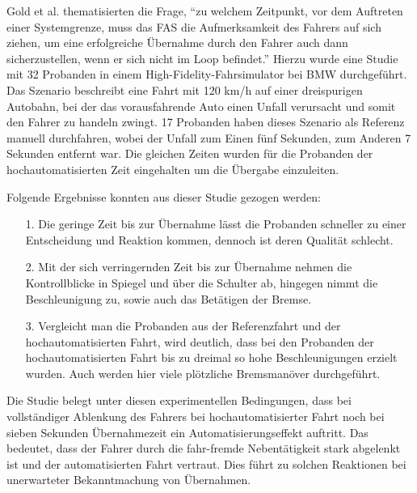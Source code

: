 Gold et al. thematisierten die Frage, ``zu welchem Zeitpunkt, vor dem Auftreten einer Systemgrenze, muss das FAS die Aufmerksamkeit des Fahrers auf sich ziehen, um eine erfolgreiche Übernahme durch den Fahrer auch dann sicherzustellen, wenn er sich nicht im Loop befindet.'' \cite{gold} %
Hierzu wurde eine Studie mit 32 Probanden in einem High-Fidelity-Fahrsimulator bei BMW durchgeführt. Das Szenario beschreibt eine Fahrt mit 120 km/h auf einer dreispurigen Autobahn, bei der das vorausfahrende Auto einen Unfall verursacht und somit den Fahrer zu handeln zwingt. 17 Probanden haben dieses Szenario als Referenz manuell durchfahren, wobei der Unfall zum Einen fünf Sekunden, zum Anderen 7 Sekunden entfernt war. Die gleichen Zeiten wurden für die Probanden der hochautomatisierten Zeit eingehalten um die Übergabe einzuleiten.  

Folgende Ergebnisse konnten aus dieser Studie gezogen werden:
\begin{itemize}
	\item[1.] Die geringe Zeit bis zur Übernahme lässt die Probanden schneller zu einer Entscheidung und Reaktion kommen, dennoch ist deren Qualität schlecht.
	\item[2.] Mit der sich verringernden Zeit bis zur Übernahme nehmen die Kontrollblicke in Spiegel und über die Schulter ab, hingegen nimmt die Beschleunigung zu, sowie auch das Betätigen der Bremse.
	\item[3.] Vergleicht man die Probanden aus der Referenzfahrt und der hochautomatisierten Fahrt, wird deutlich, dass bei den Probanden der hochautomatisierten Fahrt bis zu dreimal so hohe Beschleunigungen erzielt wurden. Auch werden hier viele plötzliche Bremsmanöver durchgeführt. 
\end{itemize}

Die Studie belegt unter diesen experimentellen Bedingungen, dass bei vollständiger Ablenkung des Fahrers bei hochautomatisierter Fahrt noch bei sieben Sekunden Übernahmezeit ein Automatisierungseffekt auftritt. Das bedeutet, dass der Fahrer durch die fahr-fremde Nebentätigkeit stark abgelenkt ist und der automatisierten Fahrt vertraut. Dies führt zu solchen Reaktionen bei unerwarteter Bekanntmachung von Übernahmen. 






